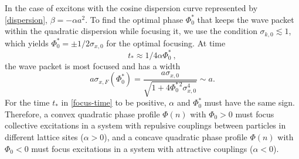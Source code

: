 %
%

In the case of excitons with the cosine dispersion curve represented by \autoref{dispersion}, $\beta = -\alpha a^2$. 
To find the optimal phase $\Phi_0^*$ that keeps the wave packet
within the quadratic dispersion while focusing it, we use the
condition $\sigma_{k, 0} \lesssim 1$, which yields
$\Phi_0^* = \pm 1/2 \sigma_{x, 0}$ for the optimal focusing. At
time
\begin{equation}
t_* \approx 1 / 4 \alpha \Phi_0^* \ , \label{focus-time}
\end{equation}
the wave packet is most
focused and has a width
%
\begin{equation}
a\sigma_{x,F} (\Phi_0^*) =  \frac{ a \sigma_{x, 0}} {\sqrt{1 + 4
\Phi_0^{*\,2} \sigma_{x, 0}^4  }} \sim a .
\label{x-focusing-Gauss}
\end{equation}
For the time $t_*$ in \autoref{focus-time} to be positive, $\alpha$ and $\Phi_0^*$ must have the same sign.
 Therefore, a convex quadratic phase profile
$\Phi(n)$ with $\Phi_0>0$ must focus collective excitations in a system with
repulsive couplings between particles in different lattice sites ($\alpha>0$), and a concave quadratic phase
profile $\Phi(n)$ with $\Phi_0<0$ must focus excitations in a system with
attractive couplings ($\alpha<0$).

